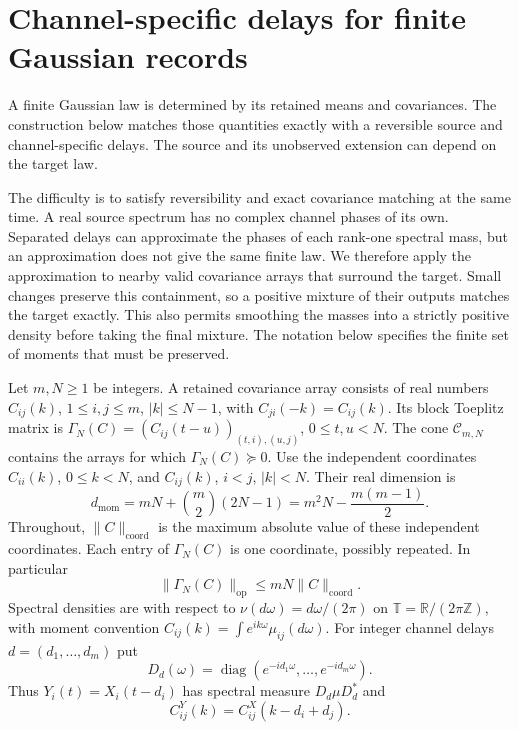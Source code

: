\section{Channel-specific delays for finite Gaussian records}\label{sec:universal}
\newcommand{\MC}{\mathcal C}
\newcommand{\MD}{\mathcal D}
\newcommand{\MT}{\mathbb T}
\newcommand{\MR}{\mathbb R}
\newcommand{\MS}{\mathbb S}

A finite Gaussian law is determined by its retained means and covariances. The construction below matches those quantities exactly with a reversible source and channel-specific delays. The source and its unobserved extension can depend on the target law.

The difficulty is to satisfy reversibility and exact covariance matching at the same time. A real source spectrum has no complex channel phases of its own. Separated delays can approximate the phases of each rank-one spectral mass, but an approximation does not give the same finite law. We therefore apply the approximation to nearby valid covariance arrays that surround the target. Small changes preserve this containment, so a positive mixture of their outputs matches the target exactly. This also permits smoothing the masses into a strictly positive density before taking the final mixture. The notation below specifies the finite set of moments that must be preserved.

Let $m,N\ge1$ be integers. A retained covariance array consists of real
numbers $C_{ij}(k)$, $1\le i,j\le m$, $|k|\le N-1$, with
$C_{ji}(-k)=C_{ij}(k)$. Its block Toeplitz matrix is
$\Gamma_N(C)=(C_{ij}(t-u))_{(t,i),(u,j)}$, $0\le t,u<N$.
The cone $\MC_{m,N}$ contains the arrays for which $\Gamma_N(C)\succeq0$.
Use the independent coordinates $C_{ii}(k)$, $0\le k<N$, and
$C_{ij}(k)$, $i<j$, $|k|<N$. Their real dimension is
\begin{equation}\label{eq:mc-dimension}
 d_{\mathrm{mom}}=mN+\binom m2(2N-1)=m^2N-\frac{m(m-1)}2.
\end{equation}
Throughout, $\|C\|_{\mathrm{coord}}$ is the maximum absolute value of
these independent coordinates. Each entry of $\Gamma_N(C)$ is one
coordinate, possibly repeated. In particular
\begin{equation}\label{eq:mc-entry-norm}
 \|\Gamma_N(C)\|_{\mathrm{op}}\le mN\|C\|_{\mathrm{coord}}.
\end{equation}
Spectral densities are with respect to $\nu(d\omega)=d\omega/(2\pi)$
on $\MT=\MR/(2\pi\mathbb Z)$, with moment convention
$C_{ij}(k)=\int e^{ik\omega}\mu_{ij}(d\omega)$.
For integer channel delays $d=(d_1,\ldots,d_m)$ put
\[
 D_d(\omega)=\operatorname{diag}(e^{-id_1\omega},\ldots,e^{-id_m\omega}).
\]
Thus $Y_i(t)=X_i(t-d_i)$ has spectral measure $D_d\mu D_d^*$ and
\begin{equation}\label{eq:mc-delay-sign}
 C^Y_{ij}(k)=C^X_{ij}(k-d_i+d_j).
\end{equation}

